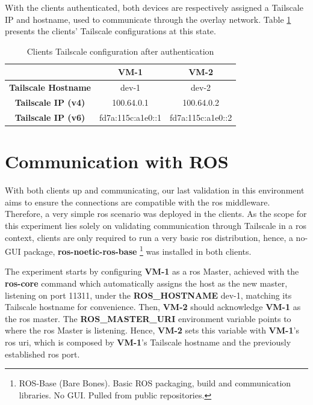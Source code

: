 \documentclass[11pt,twoside,a4paper]{report}
\begin{document}
With the clients authenticated, both devices are respectively assigned a Tailscale IP and hostname, used to communicate through the overlay network. Table \ref{tab:tsips} presents the clients' Tailscale configurations at this state.

\begin{table}[]
\centering
\begin{tabular}{c|c|c|}
\cline{2-3}
\textbf{}                                         & \textbf{VM-1} & \textbf{VM-2} \\ \hline
\multicolumn{1}{|c|}{\textbf{Tailscale Hostname}} & dev-1         & dev-2         \\ \hline
\multicolumn{1}{|c|}{\textbf{Tailscale IP (v4)}}  & 100.64.0.1    & 100.64.0.2    \\ \hline
\multicolumn{1}{|c|}{\textbf{Tailscale IP (v6)}}  & fd7a:115c:a1e0::1     & fd7a:115c:a1e0::2         \\ \hline
\end{tabular}
\caption{Clients Tailscale configuration after authentication}
\label{tab:tsips}
\end{table}

\section{Communication with ROS}

With both clients up and communicating, our last validation in this environment aims to ensure the connections are compatible with the \ac{ros} middleware. Therefore, a very simple \ac{ros} scenario was deployed in the clients. As the scope for this experiment lies solely on validating communication through Tailscale in a \ac{ros} context, clients are only required to run a very basic \ac{ros} distribution, hence, a no-GUI package, \textbf{ros-noetic-ros-base} \footnote{ROS-Base (Bare Bones). Basic ROS packaging, build and communication libraries. No GUI. Pulled from public repositories.} was installed in both clients.

The experiment starts by configuring \textbf{VM-1} as a \ac{ros} Master, achieved with the \textbf{ros-core} command which automatically assigns the host as the new master, listening on port 11311, under the \textbf{ROS\_HOSTNAME} dev-1, matching its Tailscale hostname for convenience. Then, \textbf{VM-2} should acknowledge \textbf{VM-1} as the \ac{ros} master. The \textbf{ROS\_MASTER\_URI} environment variable points to where the \ac{ros} Master is listening. Hence, \textbf{VM-2} sets this variable with \textbf{VM-1}'s \ac{ros} \ac{uri}, which is composed by \textbf{VM-1}'s Tailscale hostname and the previously established \ac{ros} port.
\end{document}

